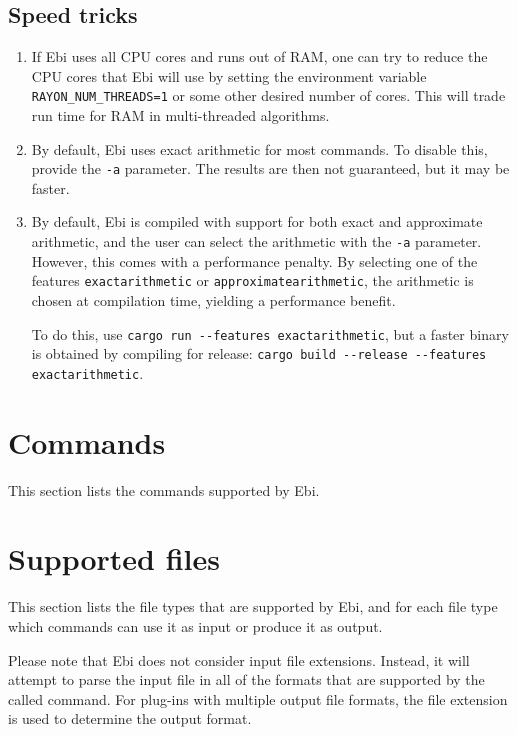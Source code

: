 \documentclass{article}
\begin{document}
	\subsection{Speed tricks}
	\label{sec:speedtricks}
		\begin{enumerate}
			\item
			\label{speedtrick:multithreaded}
			If Ebi uses all CPU cores and runs out of RAM, one can try to reduce the CPU cores that Ebi will use by setting the environment variable \verb!RAYON_NUM_THREADS=1! or some other desired number of cores.
			This will trade run time for RAM in multi-threaded algorithms.

			\item By default, Ebi uses exact arithmetic for most commands.
			To disable this, provide the \verb=-a= parameter.
			The results are then not guaranteed, but it may be faster.

   			\item By default, Ebi is compiled with support for both exact and approximate arithmetic, and the user can select the arithmetic with the \verb=-a= parameter.
            However, this comes with a performance penalty.
            By selecting one of the features \verb=exactarithmetic= or \verb=approximatearithmetic=, the arithmetic is chosen at compilation time, yielding a performance benefit.

            To do this, use \verb=cargo run --features exactarithmetic=, but a faster binary is obtained by compiling for release: \verb=cargo build --release --features exactarithmetic=.
		\end{enumerate}

\section{Commands}
\label{sec:commands}

	This section lists the commands supported by Ebi.

    \ebicommands

\clearpage
\section{Supported files}
\label{sec:filehandlers}
	This section lists the file types that are supported by Ebi, and for each file type which commands can use it as input or produce it as output.
	
    Please note that Ebi does not consider input file extensions.
    Instead, it will attempt to parse the input file in all of the formats that are supported by the called command.
    For plug-ins with multiple output file formats, the file extension is used to determine the output format.
    
\end{document}
